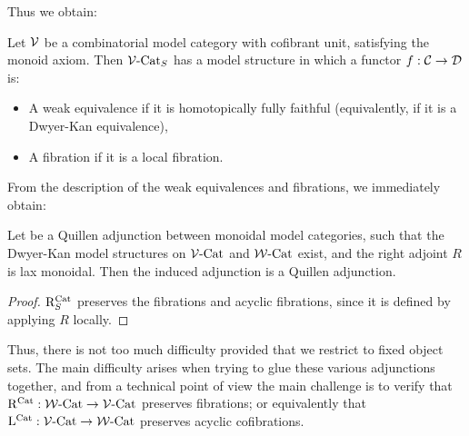 \documentclass[12pt]{amsart}
\begin{document}
Thus we obtain:
\begin{theorem}
	Let $\mathcal{V}$ be a combinatorial model category with cofibrant unit, satisfying the monoid axiom.
	Then $\mathcal{V}\text{-}\mathrm{Cat}_S$ has a model structure in which a functor $f: \mathcal{C} \to \mathcal{D}$ is:
	\begin{itemize}
		\item A weak equivalence if it is homotopically fully faithful (equivalently, if it is a Dwyer-Kan equivalence),
		\item A fibration if it is a local fibration.
	\end{itemize}
\end{theorem} 
From the description of the weak equivalences and fibrations, we immediately obtain:
\begin{theorem}\label{thm:enriched-adjunction-fixed-object-set}
	Let
	be a Quillen adjunction between monoidal model categories, such that the Dwyer-Kan model structures on $\mathcal{V}\text{-}\mathrm{Cat}$ and $\mathcal{W}\text{-}\mathrm{Cat}$ exist, and the right adjoint $R$ is lax monoidal. Then the induced adjunction
	is a Quillen adjunction.
\end{theorem}
\begin{proof}
	$\mathrm{R}^{\mathrm{Cat}}_S$ preserves the fibrations and acyclic fibrations, since it is defined by applying $R$ locally.
\end{proof}
Thus, there is not too much difficulty provided that we restrict to fixed object sets. The main difficulty arises when trying to glue these various adjunctions together, and from a technical point of view the main challenge is to verify that $\mathrm{R}^{\mathrm{Cat}}: \mathcal{W}\text{-}\mathrm{Cat} \to \mathcal{V}\text{-}\mathrm{Cat}$ preserves fibrations; or equivalently that $\mathrm{L}^{\mathrm{Cat}}: \mathcal{V}\text{-}\mathrm{Cat} \to \mathcal{W}\text{-}\mathrm{Cat}$ preserves acyclic cofibrations.
\end{document}
